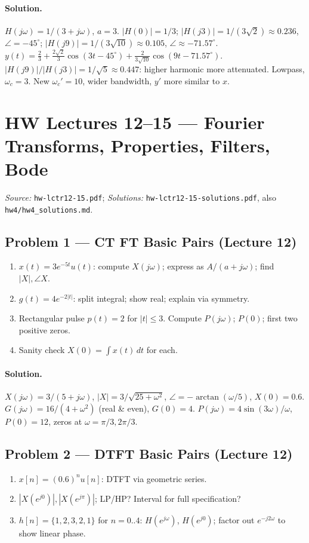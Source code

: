 \documentclass[11pt]{article}
\begin{document}
\paragraph{Solution.} $H(j\omega)=1/(3+j\omega)$, $a=3$. $|H(0)|=1/3$; $|H(j3)|=1/(3\sqrt 2)\approx 0.236$, $\angle=-45^\circ$; $|H(j9)|=1/(3\sqrt{10})\approx 0.105$, $\angle\approx -71.57^\circ$. $y(t) = \tfrac{2}{3} + \tfrac{2\sqrt 2}{3}\cos(3t-45^\circ) + \tfrac{2}{3\sqrt{10}}\cos(9t-71.57^\circ)$. $|H(j9)|/|H(j3)| = 1/\sqrt 5 \approx 0.447$: higher harmonic more attenuated. Lowpass, $\omega_c = 3$. New $\omega_c'=10$, wider bandwidth, $y'$ more similar to $x$.

\section{HW Lectures 12--15 --- Fourier Transforms, Properties, Filters, Bode}
\emph{Source:} \texttt{hw-lctr12-15.pdf}; \emph{Solutions:} \texttt{hw-lctr12-15-solutions.pdf}, also \texttt{hw4/hw4\_solutions.md}.

\subsection{Problem 1 --- CT FT Basic Pairs (Lecture 12)}
\begin{enumerate}[label=(\alph*)]
  \item $x(t)=3e^{-5t}u(t)$: compute $X(j\omega)$; express as $A/(a+j\omega)$; find $|X|,\angle X$.
  \item $g(t)=4e^{-2|t|}$: split integral; show real; explain via symmetry.
  \item Rectangular pulse $p(t)=2$ for $|t|\le 3$. Compute $P(j\omega)$; $P(0)$; first two positive zeros.
  \item Sanity check $X(0) = \int x(t)\,dt$ for each.
\end{enumerate}

\paragraph{Solution.} $X(j\omega) = 3/(5+j\omega)$, $|X|=3/\sqrt{25+\omega^2}$, $\angle = -\arctan(\omega/5)$, $X(0)=0.6$. $G(j\omega) = 16/(4+\omega^2)$ (real \& even), $G(0)=4$. $P(j\omega) = 4\sin(3\omega)/\omega$, $P(0)=12$, zeros at $\omega=\pi/3,2\pi/3$.

\subsection{Problem 2 --- DTFT Basic Pairs (Lecture 12)}
\begin{enumerate}[label=(\alph*)]
  \item $x[n]=(0.6)^n u[n]$: DTFT via geometric series.
  \item $|X(e^{j0})|, |X(e^{j\pi})|$; LP/HP? Interval for full specification?
  \item $h[n]=\{1,2,3,2,1\}$ for $n=0..4$: $H(e^{j\omega})$, $H(e^{j0})$; factor out $e^{-j2\omega}$ to show linear phase.
\end{enumerate}
\end{document}
